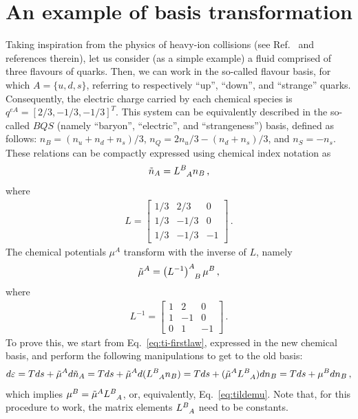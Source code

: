 \documentclass[
a4paper,
amsfonts,
amsmath,
reprint,
showkeys,
nofootinbib,
twoside,
onecolumn,
notitlepage
]{revtex4-1}
\begin{document}
	\appendix
	
	\section{An example of basis transformation}
	\label{app:basis}
	
	Taking inspiration from the physics of heavy-ion collisions (see Ref.\ \cite{Fotakis:2022usk} and references therein), let us consider (as a simple example) a fluid comprised of three flavours of quarks. 
	Then, we can work in the so-called flavour basis, for which $A=\{u,d,s\}$, referring to respectively  ``up'', ``down'', and ``strange'' quarks. 
	Consequently, the electric charge carried by each chemical species is $q^{eA}=[2/3,-1/3,-1/3]^T$.
	This system can be equivalently described in the so-called $BQS$ (namely ``baryon'', ``electric'', and ``strangeness'') basis, defined as follows:  $n_B = (n_u+n_d+n_s)/3$, $n_Q = 2n_u/3-(n_d+n_s)/3$, and $n_S=-n_s$. These relations can be compactly expressed using chemical index notation \cite{Carter_starting_point} as
	\begin{equation}
		\tilde{n}_A = L\indices{^B_A} n_B  \,,
	\end{equation}
	where
	\begin{eqnarray}
		L = \begin{bmatrix}
			
			1/3 & 2/3 & 0 \\
			1/3 & -1/3 & 0 \\
			1/3 & -1/3 & -1
		\end{bmatrix}\,.
	\end{eqnarray}
	The chemical potentials $\mu^A$ transform with the inverse of $L$, namely
	\begin{equation}\label{eq:tildemu}
		\tilde{\mu}^A =   \left(L^{-1}\right)\indices{^A _B} \mu^B\,,
	\end{equation}
	where 
	\begin{eqnarray}
		L^{-1} = \begin{bmatrix}
			1 & 2 & 0 \\
			1 & -1 & 0 \\
			0 & 1 & -1
		\end{bmatrix}\,.
	\end{eqnarray}
	To prove this, we start from Eq.\ \eqref{eq:ti-firstlaw}, expressed in the new chemical basis, and perform the following manipulations to get to the old basis:
	\begin{equation}
		d\ed = Tds +\tilde{\mu}^A d\tilde{n}_A= Tds +\tilde{\mu}^A d(L\indices{^B_A} n_B)=Tds +(\tilde{\mu}^A L\indices{^B_A})d n_B=Tds +\mu^B dn_B \,,
	\end{equation}
	which implies $\mu^B=\tilde{\mu}^A L\indices{^B_A}$, or, equivalently, Eq.\ \eqref{eq:tildemu}.
	Note that, for this procedure to work, the matrix elements $L\indices{^B_A}$ need to be constants.
	
\end{document}
